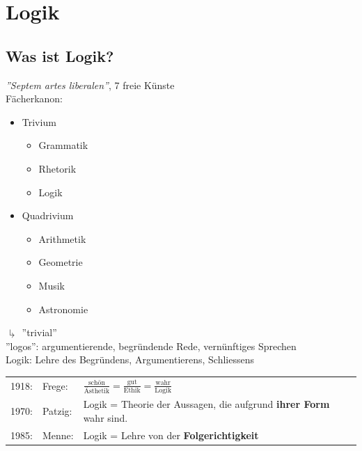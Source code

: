 \chapter{Logik}
\section{Was ist Logik?}
\textit{''Septem artes liberalen''}, 7 freie Künste \\
Fächerkanon:
\begin{itemize}
	\item Trivium
	\begin{itemize}
		\item Grammatik
		\item Rhetorik
		\item Logik
	\end{itemize}
	\item Quadrivium
	\begin{itemize}
		\item Arithmetik
		\item Geometrie
		\item Musik
		\item Astronomie
	\end{itemize}
\end{itemize}
$\drsh$ ''trivial'' \\
''logos'': argumentierende, begründende Rede, vernünftiges Sprechen \\
Logik: Lehre des Begründens, Argumentierens, Schliessens \\
\begin{tabular}{lll}
	1918:	& Frege:	& $\frac{\text{schön}}{\text{Ästhetik}} = \frac{\text{gut}}{\text{Ethik}} = \frac{\text{wahr}}{\text{Logik}}$ \\
	1970:	& Patzig:	& Logik = Theorie der Aussagen, die aufgrund \textbf{ihrer Form} wahr sind. \\
	1985:	& Menne:	& Logik = Lehre von der \textbf{Folgerichtigkeit}
\end{tabular}
